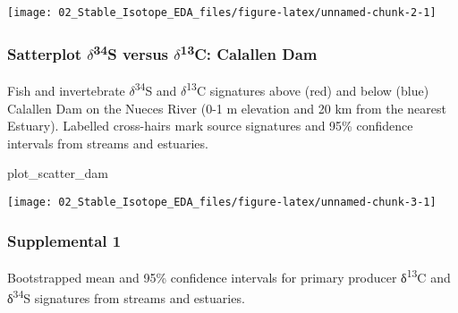 \documentclass[
]{article}
\newenvironment{Shaded}{\begin{snugshade}}{\end{snugshade}}
\newcommand{\NormalTok}[1]{#1}
\begin{document}
\begin{center}\texttt{[image: 02\_Stable\_Isotope\_EDA\_files/figure-latex/unnamed-chunk-2-1]} \end{center}

\newpage

\hypertarget{satterplot-delta34s-versus-delta13c-calallen-dam}{%
\subsubsection{\texorpdfstring{Satterplot
\(\delta\)\textsuperscript{34}S versus \(\delta\)\textsuperscript{13}C:
Calallen
Dam}{Satterplot \textbackslash delta34S versus \textbackslash delta13C: Calallen Dam}}\label{satterplot-delta34s-versus-delta13c-calallen-dam}}

Fish and invertebrate \(\delta\)\textsuperscript{34}S and
\(\delta\)\textsuperscript{13}C signatures above (red) and below (blue)
Calallen Dam on the Nueces River (0-1 m elevation and 20 km from the
nearest Estuary). Labelled cross-hairs mark source signatures and 95\%
confidence intervals from streams and estuaries.

\begin{Shaded}
\begin{Highlighting}[]
\NormalTok{plot\_scatter\_dam}
\end{Highlighting}
\end{Shaded}

\begin{center}\texttt{[image: 02\_Stable\_Isotope\_EDA\_files/figure-latex/unnamed-chunk-3-1]} \end{center}

\newpage

\hypertarget{supplemental-1}{%
\subsubsection{Supplemental 1}\label{supplemental-1}}

Bootstrapped mean and 95\% confidence intervals for primary producer
δ\textsuperscript{13}C and δ\textsuperscript{34}S signatures from
streams and estuaries.
\end{document}
